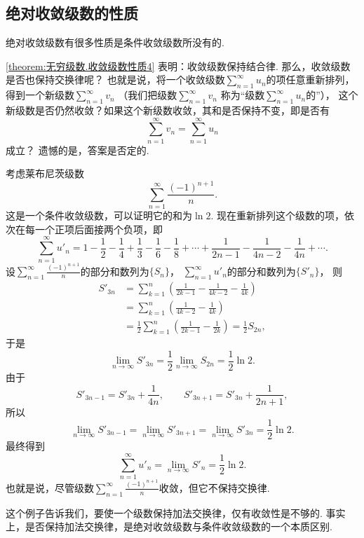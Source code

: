\subsection{绝对收敛级数的性质}
绝对收敛级数有很多性质是条件收敛级数所没有的.

\cref{theorem:无穷级数.收敛级数性质4} 表明：收敛级数保持结合律.
那么，收敛级数是否也保持交换律呢？
也就是说，将一个收敛级数\(\sum_{n=1}^\infty u_n\)的项任意重新排列，
得到一个新级数\(\sum_{n=1}^\infty v_n\)
（我们把级数\(\sum_{n=1}^\infty v_n\)
称为“级数\(\sum_{n=1}^\infty u_n\)的”），
这个新级数是否仍然收敛？如果这个新级数收敛，其和是否保持不变，即是否有\[
	\sum_{n=1}^\infty v_n = \sum_{n=1}^\infty u_n
\]成立？
遗憾的是，答案是否定的.

考虑莱布尼茨级数\[
	\sum_{n=1}^\infty \frac{(-1)^{n+1}}n.
\]
这是一个条件收敛级数，可以证明它的和为\(\ln2\).
现在重新排列这个级数的项，依次在每一个正项后面接两个负项，即\[
	\sum_{n=1}^\infty u'_n
	= 1 - \frac12 - \frac14
	+ \frac13 - \frac16 - \frac18
	+ \dotsb
	+ \frac1{2n-1} - \frac1{4n-2} - \frac1{4n}
	+ \dotsb.
\]
设\(\sum_{n=1}^\infty \frac{(-1)^{n+1}}n\)的部分和数列为\(\{S_n\}\)，
\(\sum_{n=1}^\infty u'_n\)的部分和数列为\(\{S'_n\}\)，
则\begin{align*}
	S'_{3n}
	&= \sum_{k=1}^n \left(
		\frac1{2k-1} - \frac1{4k-2} - \frac1{4k}
	\right) \\
	&= \sum_{k=1}^n \left(
		\frac1{4k-2} - \frac1{4k}
	\right) \\
	&= \frac12 \sum_{k=1}^n \left(
		\frac1{2k-1} - \frac1{2k}
	\right)
	= \frac12 S_{2n},
\end{align*}
于是\[
	\lim_{n\to\infty} S'_{3n}
	= \frac12 \lim_{n\to\infty} S_{2n}
	= \frac12 \ln 2.
\]
由于\[
	S'_{3n-1} = S'_{3n} + \frac1{4n},
	\qquad
	S'_{3n+1} = S'_{3n} + \frac1{2n+1},
\]
所以\[
	\lim_{n\to\infty} S'_{3n-1}
	= \lim_{n\to\infty} S'_{3n+1}
	= \lim_{n\to\infty} S'_{3n}
	= \frac12 \ln 2.
\]
最终得到\[
	\sum_{n=1}^\infty u'_n
	= \lim_{n\to\infty} S'_n
	= \frac12 \ln 2.
\]
也就是说，尽管级数\(\sum_{n=1}^\infty \frac{(-1)^{n+1}}n\)收敛，但它不保持交换律.

这个例子告诉我们，要使一个级数保持加法交换律，仅有收敛性是不够的.
事实上，是否保持加法交换律，是绝对收敛级数与条件收敛级数的一个本质区别.

